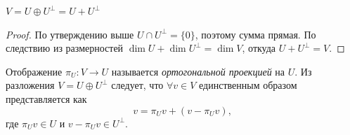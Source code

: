 \begin{cor}
	$V = U \oplus U^\perp = U + U^\perp $
	\begin{proof}
		По утверждению выше $U \cap U^\perp = \{0\}$, поэтому сумма прямая. По следствию из размерностей $\dim U + \dim U^\perp = \dim V$,
  откуда $U + U^\perp = V$.
	\end{proof}
\end{cor}

\begin{definition}
	Отображение $\pi_U : V \to U$ называется \emph{ортогональной проекцией} на $U$. Из разложения $V = U \oplus U^\perp$ следует,
 что $\forall v \in V$ единственным образом представляется как
	\[
		v = \pi_U v + (v - \pi_U v),
	\]
	где $\pi_U v \in U$ и $v - \pi_U v \in U^\perp$.
\end{definition}


